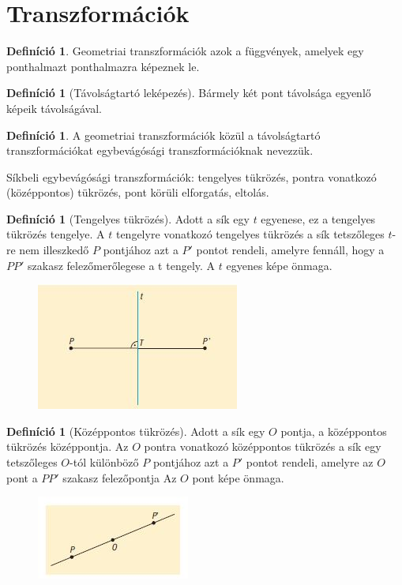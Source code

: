 \documentclass[twoside,12pt]{report}
\theoremstyle{definition}
\newtheorem{definition}[theorem]{Definíció}
\begin{document}
\section{Transzformációk}
	\begin{definition}
		Geometriai transzformációk azok a függvények, amelyek egy ponthalmazt ponthalmazra képeznek le.
	\end{definition}
	\begin{definition}[Távolságtartó leképezés]
		Bármely két pont távolsága egyenlő képeik távolságával.
	\end{definition}
	\begin{definition}
		A geometriai transzformációk közül a távolságtartó transzformációkat egybevágósági
		transzformációknak nevezzük.
	\end{definition}
	Síkbeli egybevágósági transzformációk: tengelyes tükrözés, pontra vonatkozó (középpontos)
	tükrözés, pont körüli elforgatás, eltolás.
	\begin{definition}[Tengelyes tükrözés]
		Adott a sík egy $t$ egyenese, ez a tengelyes tükrözés tengelye. A $t$ tengelyre vonatkozó tengelyes tükrözés a sík tetszőleges $t$-re nem illeszkedő $P$ pontjához azt a $P'$ pontot rendeli, amelyre fennáll, hogy a $PP'$ szakasz felezőmerőlegese a t tengely. A $t$ egyenes képe önmaga.
	\end{definition}
	\begin{figure}[H]
		\centering
		\includegraphics[width=0.3\linewidth]{Tengely}
	\end{figure}
	\begin{definition}[Középpontos tükrözés]
		Adott a sík egy $O$ pontja, a középpontos tükrözés középpontja. Az $O$ pontra vonatkozó középpontos tükrözés a sík egy tetszőleges $O$-tól különböző $P$ pontjához azt a $P'$ pontot rendeli, amelyre az $O$ pont a $PP'$ szakasz felezőpontja Az $O$ pont képe önmaga.
	\end{definition}
	\begin{figure}[H]
		\centering
		\includegraphics[width=0.3\linewidth]{KPont}
	\end{figure}
\end{document}
